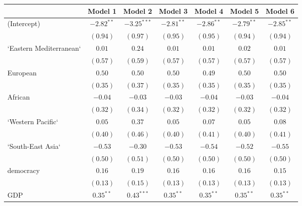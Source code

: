 
\begin{table}[!h]
\begin{center}
\begin{tabular}{l c c c c c c }
\toprule
 & Model 1 & Model 2 & Model 3 & Model 4 & Model 5 & Model 6 \\
\midrule
(Intercept)             & $-2.82^{**}$ & $-3.25^{***}$ & $-2.81^{**}$ & $-2.86^{**}$ & $-2.79^{**}$ & $-2.85^{**}$ \\
                        & $(0.94)$     & $(0.97)$      & $(0.95)$     & $(0.95)$     & $(0.94)$     & $(0.94)$     \\
`Eastern Mediterranean` & $0.01$       & $0.24$        & $0.01$       & $0.01$       & $0.02$       & $0.01$       \\
                        & $(0.57)$     & $(0.59)$      & $(0.57)$     & $(0.57)$     & $(0.57)$     & $(0.57)$     \\
European                & $0.50$       & $0.50$        & $0.50$       & $0.49$       & $0.50$       & $0.50$       \\
                        & $(0.35)$     & $(0.37)$      & $(0.35)$     & $(0.35)$     & $(0.35)$     & $(0.35)$     \\
African                 & $-0.04$      & $-0.03$       & $-0.03$      & $-0.04$      & $-0.03$      & $-0.04$      \\
                        & $(0.32)$     & $(0.34)$      & $(0.32)$     & $(0.32)$     & $(0.32)$     & $(0.32)$     \\
`Western Pacific`       & $0.05$       & $0.37$        & $0.05$       & $0.07$       & $0.05$       & $0.08$       \\
                        & $(0.40)$     & $(0.46)$      & $(0.40)$     & $(0.41)$     & $(0.40)$     & $(0.41)$     \\
`South-East Asia`       & $-0.53$      & $-0.30$       & $-0.53$      & $-0.54$      & $-0.52$      & $-0.55$      \\
                        & $(0.50)$     & $(0.51)$      & $(0.50)$     & $(0.50)$     & $(0.50)$     & $(0.50)$     \\
democracy               & $0.16$       & $0.19$        & $0.16$       & $0.16$       & $0.16$       & $0.15$       \\
                        & $(0.13)$     & $(0.15)$      & $(0.13)$     & $(0.13)$     & $(0.13)$     & $(0.13)$     \\
GDP                     & $0.35^{**}$  & $0.43^{***}$  & $0.35^{**}$  & $0.35^{**}$  & $0.35^{**}$  & $0.35^{**}$  \\

\end{tabular}
\end{center}
\end{table}
